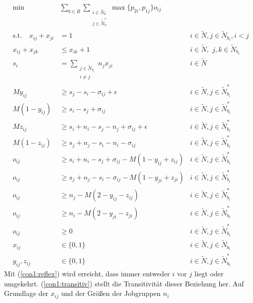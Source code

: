 \documentclass{scrreprt}
\begin{document}
\begin{align}
    \text{min}\quad &\sum_{b\in B}\sum_{\substack{i\in \tilde{N_b}\\j\in \tilde{N}_b^*}} 
            \max\{p_{2i},p_{1j}\}o_{ij} \label{objfunc1}\\
			\text{s.t.} \quad x_{ij} + x_{ji} &= 1 &i\in \tilde{N}, j\in \tilde{N}_{b_i}, i<j \label{con1:reflex}\\
			x_{ij} + x_{jk} &\leq x_{ik} + 1 &i\in \tilde{N},\,\, j,k\in \tilde{N}_{b_i} \label{con1:transitiv} \\
			s_i &= \sum_{\substack{j\in \tilde{N}_{b_i}\\i\neq j}} n_j x_{ji} &i\in \tilde{N} \label{con1:start} \\
            My_{ij} &\geq s_j - s_i - \sigma_{ij} + \epsilon &i\in \tilde{N}, j\in \tilde{N}^*_{b_i} \label{con1:y1} \\
            M(1-y_{ij}) &\geq s_i - s_j + \sigma_{ij} &i\in \tilde{N}, j\in \tilde{N}^*_{b_i} \label{con1:y2} \\
            Mz_{ij} &\geq s_i + n_i - s_j - n_j + \sigma_{ij} + \epsilon &i\in \tilde{N}, j\in \tilde{N}^*_{b_i} \label{con1:z1} \\
            M(1-z_{ij}) &\geq s_j + n_j- s_i - n_i - \sigma_{ij} &i\in \tilde{N}, j\in \tilde{N}^*_{b_i} \label{con1:z2} \\
            o_{ij} &\geq s_i + n_i - s_j + \sigma_{ij} - M(1-y_{ij}+z_{ij}) &i\in \tilde{N}, j\in \tilde{N}^*_{b_i} \label{con1:o1} \\
            o_{ij} &\geq s_j + n_j - s_i - \sigma_{ij} - M(1-y_{ji}+z_{ji}) &i\in \tilde{N}, j\in \tilde{N}^*_{b_i} \label{con1:o2} \\
            o_{ij} &\geq n_j - M(2-y_{ij}-z_{ij}) &i\in \tilde{N}, j\in \tilde{N}^*_{b_i} \label{con1:o3} \\
            o_{ij} &\geq n_i - M(2-y_{ji}-z_{ji}) &i\in \tilde{N}, j\in \tilde{N}^*_{b_i} \label{con1:o4} \\
            o_{ij} &\geq 0 &i\in \tilde{N}, j\in \tilde{N}^*_{b_i} \label{con1:o5} \\
            x_{ij} &\in \{0,1\} &i\in \tilde{N}, j\in \tilde{N}_{b_i} \\
            y_{ij},z_{ij} &\in \{0,1\} &i\in \tilde{N}, j\in \tilde{N}^*_{b_i}
\end{align}
Mit (\ref{con1:reflex}) wird erreicht, dass immer entweder $i$ vor $j$ liegt
oder umgekehrt. (\ref{con1:transitiv}) stellt die Transitivität dieser Beziehung
her. Auf Grundlage der $x_{ij}$ und der Größen der Jobgruppen $n_i$ 
\end{document}
